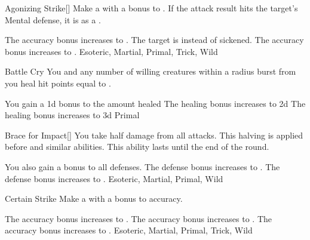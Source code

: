 
\lowercase{\hypertarget{maneuver:Agonizing Strike}{}}\label{maneuver:Agonizing Strike}
\begin{apability}{\hypertarget{maneuver:Agonizing Strike}{Agonizing Strike}}[]
Make a  with a  bonus to .
If the attack result hits the target's Mental defense,
it is  as a .

\rankline
{} The accuracy bonus increases to .
 The target is  instead of sickened.
 The accuracy bonus increases to .
 Esoteric, Martial, Primal, Trick, Wild
\end{apability}
\vspace{0.25em}



\lowercase{\hypertarget{maneuver:Battle Cry}{}}\label{maneuver:Battle Cry}
\begin{apability}{\hypertarget{maneuver:Battle Cry}{Battle Cry}}
You and any number of willing creatures within a \arealarge radius burst from you
heal hit points equal to .

\rankline
{} You gain a \plus1d bonus to the amount healed
 The healing bonus increases to \plus2d
 The healing bonus increases to \plus3d
 Primal
\end{apability}
\vspace{0.25em}



\lowercase{\hypertarget{maneuver:Brace for Impact}{}}\label{maneuver:Brace for Impact}
\begin{freeability}{\hypertarget{maneuver:Brace for Impact}{Brace for Impact}}[]
You take half damage from all attacks.
This halving is applied before  and similar abilities.
This ability lasts until the end of the round.

\rankline
{} You also gain a  bonus to all defenses.
 The defense bonus increases to .
 The defense bonus increases to .
 Esoteric, Martial, Primal, Wild
\end{freeability}
\vspace{0.25em}



\lowercase{\hypertarget{maneuver:Certain Strike}{}}\label{maneuver:Certain Strike}
\begin{apability}{\hypertarget{maneuver:Certain Strike}{Certain Strike}}
Make a  with a  bonus to accuracy.

\rankline
{} The accuracy bonus increases to .
 The accuracy bonus increases to .
 The accuracy bonus increases to .
 Esoteric, Martial, Primal, Trick, Wild
\end{apability}
\vspace{0.25em}



